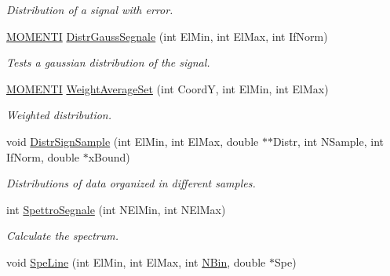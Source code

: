 \begin{DoxyCompactItemize}
\begin{DoxyCompactList}\small\item\em \-Distribution of a signal with error. \end{DoxyCompactList}\item 
\hypertarget{classVarDatFile_ac5e7b70f512f6a7a4dd83e942a65537a}{\hyperlink{structMOMENTI}{\-M\-O\-M\-E\-N\-T\-I} \hyperlink{classVarDatFile_ac5e7b70f512f6a7a4dd83e942a65537a}{\-Distr\-Gauss\-Segnale} (int \-El\-Min, int \-El\-Max, int \-If\-Norm)}\label{classVarDatFile_ac5e7b70f512f6a7a4dd83e942a65537a}

\begin{DoxyCompactList}\small\item\em \-Tests a gaussian distribution of the signal. \end{DoxyCompactList}\item 
\hypertarget{classVarDatFile_acc46e4201d7bdf288601a253bd569ed0}{\hyperlink{structMOMENTI}{\-M\-O\-M\-E\-N\-T\-I} \hyperlink{classVarDatFile_acc46e4201d7bdf288601a253bd569ed0}{\-Weight\-Average\-Set} (int \-Coord\-Y, int \-El\-Min, int \-El\-Max)}\label{classVarDatFile_acc46e4201d7bdf288601a253bd569ed0}

\begin{DoxyCompactList}\small\item\em \-Weighted distribution. \end{DoxyCompactList}\item 
\hypertarget{classVarDatFile_ab0b5ef5ddc23685148eda453b09ba2f5}{void \hyperlink{classVarDatFile_ab0b5ef5ddc23685148eda453b09ba2f5}{\-Distr\-Sign\-Sample} (int \-El\-Min, int \-El\-Max, double $\ast$$\ast$\-Distr, int \-N\-Sample, int \-If\-Norm, double $\ast$x\-Bound)}\label{classVarDatFile_ab0b5ef5ddc23685148eda453b09ba2f5}

\begin{DoxyCompactList}\small\item\em \-Distributions of data organized in different samples. \end{DoxyCompactList}\item 
\hypertarget{classVarDatFile_a1454407975f3283a2786d1f5a30c537f}{int \hyperlink{classVarDatFile_a1454407975f3283a2786d1f5a30c537f}{\-Spettro\-Segnale} (int \-N\-El\-Min, int \-N\-El\-Max)}\label{classVarDatFile_a1454407975f3283a2786d1f5a30c537f}

\begin{DoxyCompactList}\small\item\em \-Calculate the spectrum. \end{DoxyCompactList}\item 
\hypertarget{classVarDatFile_a3a27fb16efc015da73aeb6d511d87252}{void \hyperlink{classVarDatFile_a3a27fb16efc015da73aeb6d511d87252}{\-Spe\-Line} (int \-El\-Min, int \-El\-Max, int \hyperlink{classVarDatFile_a6a683d7b3c08aafd7a5329b0d293eab6}{\-N\-Bin}, double $\ast$\-Spe)}\label{classVarDatFile_a3a27fb16efc015da73aeb6d511d87252}


\end{DoxyCompactItemize}
